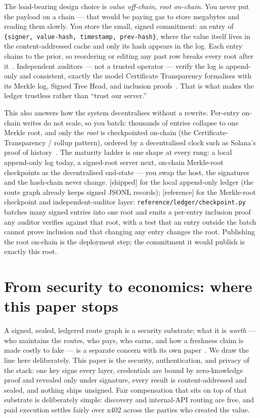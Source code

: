 \documentclass[11pt]{article}
\newcommand{\impl}{\textcolor{green!55!black}{\small[shipped]}}
\newcommand{\refimpl}{\textcolor{blue!70!black}{\small[reference]}}
\begin{document}
The load-bearing design choice is \emph{value off-chain, root on-chain}. You never
put the payload on a chain --- that would be paying gas to store megabytes and
reading them slowly. You store the small, signed commitment: an entry of
\texttt{\{signer, value-hash, timestamp, prev-hash\}}, where the value itself lives
in the content-addressed cache and only its hash appears in the log. Each entry
chains to the prior, so reordering or editing any past row breaks every root after
it~\cite{bitcoin}. Independent auditors --- not a trusted operator --- verify the
log is append-only and consistent, exactly the model Certificate Transparency
formalises with its Merkle log, Signed Tree Head, and inclusion
proofs~\cite{rfc6962}. That is what makes the ledger trustless rather than
``trust our server.''

This also answers how the system decentralises without a rewrite. Per-entry
on-chain writes do not scale, so you batch: thousands of entries collapse to one
Merkle root, and only the \emph{root} is checkpointed on-chain (the
Certificate-Transparency / rollup pattern), ordered by a decentralised clock such
as Solana's proof of history~\cite{solana}. The maturity ladder is one shape at
every rung: a local append-only log today, a signed-root server next, on-chain
Merkle-root checkpoints as the decentralised end-state --- you swap the host, the
signatures and the hash-chain never change. \impl{} for the local append-only
ledger (the route graph already keeps signed JSONL records); \refimpl{} for the
Merkle-root checkpoint and independent-auditor layer:
\texttt{reference/ledger/checkpoint.py} batches many signed entries into one root
and emits a per-entry inclusion proof any auditor verifies against that root, with a
test that an entry outside the batch cannot prove inclusion and that changing any
entry changes the root. Publishing the root on-chain is the deployment step; the
commitment it would publish is exactly this root.

\section{From security to economics: where this paper stops}

A signed, sealed, ledgered route graph is a security substrate; what it is
\emph{worth} --- who maintains the routes, who pays, who earns, and how a freshness
claim is made costly to fake --- is a separate concern with its own
paper~\cite{maintenance}. We draw the line here deliberately. This paper is the security, authentication, and privacy
of the stack: one key signs every layer, credentials are bound by zero-knowledge
proof and revealed only under signature, every result is content-addressed and
sealed, and nothing ships unsigned. Fair compensation that sits on top of that
substrate is deliberately simple: discovery and internal-API routing are free, and
paid execution settles fairly over x402 across the parties who created the value.
\end{document}
